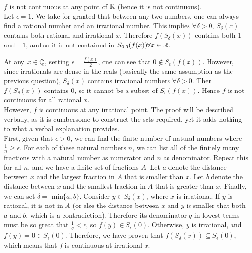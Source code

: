 
\begin{solution}
 \\$f$ is not continuous at any point of $\mathbb{R}$ (hence it is not continuous). \\
 Let $\epsilon = 1$. We take for granted that between any two numbers, one can always find a rational number and an irrational number. This implies $\forall \delta > 0$, $S_\delta(x)$ contains both rational and irrational $x$. Therefore $f(S_\delta(x))$ contains both 1 and $-1$, and so it is not contained in $S_{0.5}(f(x)) \forall x \in \mathbb{R}$.
\end{solution}


\begin{solution}
 At any $x \in \mathbb{Q}$, setting $\epsilon = \frac{f(x)}{2}$, one can see that $0 \notin S_\epsilon(f(x))$. However, since irrationals are dense in the reals (basically the same assumption as the previous question), $S_\delta(x)$ contains irrational numbers $\forall \delta > 0$. Then $f(S_\delta(x))$ contains $0$, so it cannot be a subset of $S_\epsilon(f(x))$. Hence $f$ is not continuous for all rational $x$. \\
 However, $f$ is continuous at any irrational point. The proof will be described verbally, as it is cumbersome to construct the sets required, yet it adds nothing to what a verbal explanation provides. \\
 First, given that $\epsilon > 0$, we can find the finite number of natural numbers where $\frac{1}{n} \geq \epsilon$. For each of these natural numbers $n$, we can list all of the finitely many fractions with a natural number as numerator and $n$ as denominator. Repeat this for all $n$, and we have a finite set of fractions $A$. Let $a$ denote the distance between $x$ and the largest fraction in $A$ that is smaller than $x$. Let $b$ denote the distance between $x$ and the smallest fraction in $A$ that is greater than $x$. Finally, we can set $\delta =$ min$\{a,b\}$. Consider $y \in S_\delta(x)$, where $x$ is irrational. If $y$ is rational, it is not in $A$ (or else the distance between $x$ and $y$ is smaller that both $a$ and $b$, which is a contradiction). Therefore its denominator $q$ in lowest terms must be so great that $\frac{1}{q} < \epsilon$, so $f(y) \in S_\epsilon(0)$. Otherwise, $y$ is irrational, and $f(y) = 0 \in S_\epsilon(0)$. Therefore, we have proven that $f(S_\delta(x)) \subseteq S_\epsilon(0)$, which means that $f$ is continuous at irrational $x$.
\end{solution}
